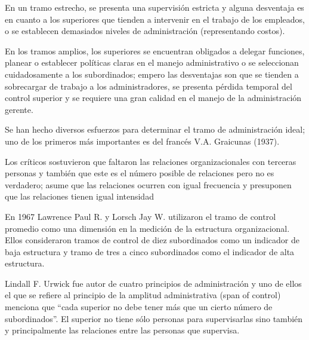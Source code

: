 En un tramo estrecho, se presenta una supervisión estricta y alguna desventaja es en cuanto a los superiores que tienden a intervenir en el trabajo de los empleados, o se establecen demasiados niveles de administración (representando costos).

En los tramos amplios, los superiores se encuentran obligados a delegar funciones, planear o establecer políticas claras en el manejo administrativo o se seleccionan cuidadosamente a los subordinados; empero las desventajas son que se tienden a sobrecargar de trabajo a los administradores, se presenta pérdida temporal del control superior y se requiere una gran calidad en el manejo de la administración gerente.

Se han hecho diversos esfuerzos para determinar el tramo de administración ideal; uno de los primeros más importantes es del francés V.A. Graicunas (1937).

Los críticos sostuvieron que faltaron las relaciones organizacionales con terceras personas y también que este es el número posible de relaciones pero no es verdadero; asume que las relaciones ocurren con igual frecuencia y presuponen que las relaciones tienen igual intensidad


En 1967 Lawrence Paul R. y Lorsch Jay W. utilizaron el tramo de control promedio como una dimensión en la medición de la estructura organizacional. Ellos consideraron tramos de control de diez subordinados como un indicador de baja estructura y tramo de tres a cinco subordinados como el indicador de alta estructura.

Lindall F. Urwick fue autor de cuatro principios de administración y uno de  ellos el que se refiere al principio de la amplitud administrativa (span of control) menciona que ``cada superior no debe tener más que un cierto número de subordinados''. El superior no tiene sólo personas para supervisarlas sino también y principalmente las relaciones entre las personas que supervisa.

